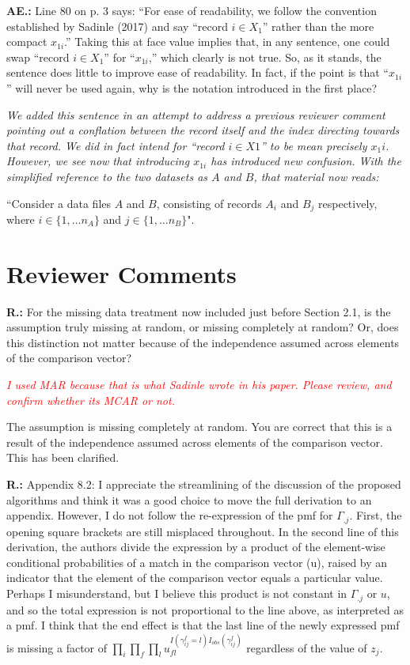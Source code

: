 \documentclass[letterpaper, parskip]{scrartcl}
\newcommand{\pointRaised}[2]{%
	\textbf{#1.\theresponsectr:} #2
}
\newcounter{responsectr}[section]     %
\newcommand{\reply}[1]{%
	\refstepcounter{responsectr}%
		\begin{tcolorbox}
			\itshape #1
		\end{tcolorbox}
}
\begin{document}
\pointRaised{AE}{Line 80 on p. 3 says: “For ease of readability, we follow the convention established by Sadinle (2017) and say “record $i \in X_1$” rather than the more compact $x_{1i}$.” Taking this at face value implies that, in any sentence, one could swap “record $i \in X_1$” for “$x_{1i}$,” which clearly is not true.  So, as it stands, the sentence does little to improve ease of readability.  In fact, if the point is that “$x_{1i}$” will never be used again, why is the notation introduced in the first place?}
\reply{We added this sentence in an attempt to address a previous reviewer comment pointing out a conflation between the record itself and the index directing towards that record. We did in fact intend for “record $i \in X1$” to be mean precisely $x_1i$. However, we see now that introducing $x_{1i}$ has introduced new confusion. With the simplified reference to the two datasets as $A$ and $B$, that material now reads: 
	
	``Consider a data files $A$ and $B$, consisting of records $A_i$ and $B_j$ respectively, where $i \in \{1, \ldots n_A\}$ and $j \in \{1, \ldots n_B\}$".
}

\setcounter{responsectr}{0}
\section{Reviewer Comments}

	\pointRaised{R}{%
	For the missing data treatment now included just before Section 2.1, is the assumption truly
	missing at random, or missing completely at random? Or, does this distinction not matter
	because of the independence assumed across elements of the comparison vector?}

	\reply{%
\textcolor{red}{I used MAR because that is what Sadinle wrote in his paper. Please review, and confirm whether its MCAR or not.}		

The assumption is missing completely at random. You are correct that this is a result of the independence assumed across elements of the comparison vector. This has been clarified.
	}

	\pointRaised{R}{%
	Appendix 8.2: I appreciate the streamlining of the discussion of the proposed algorithms and
	think it was a good choice to move the full derivation to an appendix. However, I do not follow
	the re-expression of the pmf for $\Gamma_{.j}$. First, the opening square brackets are still misplaced
	throughout. In the second line of this derivation, the authors divide the expression by a product
	of the element-wise conditional probabilities of a match in the comparison vector (u), raised by
	an indicator that the element of the comparison vector equals a particular value. Perhaps I
	misunderstand, but I believe this product is not constant in $\Gamma_{.j}$ or $u$, and so the total expression
	is not proportional to the line above, as interpreted as a pmf. I think that the end effect is that
	the last line of the newly expressed pmf is missing a factor of $\prod_i \prod_f \prod_l u_{fl}^{I(\gamma_{ij}^f = l) I_{obs}(\gamma_{ij}^f)}$ regardless of the value of $z_j$.}
\end{document}
